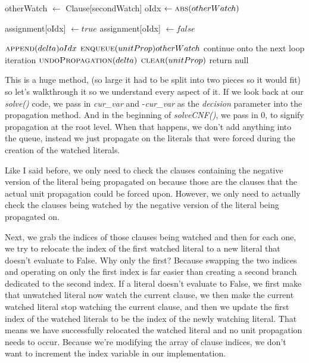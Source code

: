 \begin{algorithm}[H]
\caption{check if the current assignment is valid}\label{alg:20}
\begin{algorithmic}[1]

\State otherWatch $\gets$ Clause[secondWatch]
\State oIdx $\gets \Call{abs}{otherWatch}$

        \State assignment[oIdx] $\gets true$
    \Else 
        \State assignment[oIdx] $\gets false$
    \EndIf

    \State $\Call{append}{delta}{oIdx}$
    \State $\Call{enqueue}{unitProp}{otherWatch}$
\Else
        \State continue onto the next loop iteration
    \Else 
        \State $\Call{undoPropagation}{delta}$
        \State $\Call{clear}{unitProp}$
        \State return null
    \EndIf
\EndIf

\EndProcedure
\end{algorithmic}
\end{algorithm}

This is a huge method, (so large it had to be split into two pieces so it would fit)
so let's walkthrough it so we understand every aspect of it. If we look back at our \textit{solve()} 
code, we pass in \textit{cur\_var} and -\textit{cur\_var} as the \textit{decision} parameter into
the propagation method. And in the beginning of \textit{solveCNF()}, we pass in $0$, to signify propagation at the 
root level. When that happens, we don't add anything into the queue, instead we just propagate 
on the literals that were forced during the creation of the watched literals. 

Like I said before, we only need to check the clauses containing the negative version of the 
literal being propagated on because those are the clauses that the actual unit propagation could 
be forced upon. However, we only need to actually check the clauses being watched by the negative 
version of the literal being propagated on. 

Next, we grab the indices of those clauses being watched and then for each one, we try 
to relocate the index of the first watched literal to a new literal that doesn't evaluate 
to False. Why only the first? Because swapping the two indices and operating on only the 
first index is far easier than creating a second branch dedicated to the second index.
If a literal doesn't evaluate to False, we first make that unwatched literal now watch 
the current clause, we then make the current watched literal stop watching the current clause,
and then we update the first index of the watched literals to be the index of the newly 
watching literal. That means we have successfully relocated the watched literal and no 
unit propagation needs to occur. Because we're modifying the array of clause indices, 
we don't want to increment the index variable in our implementation.

